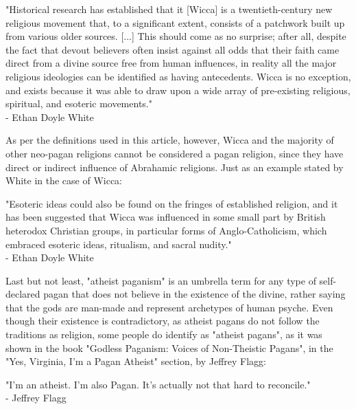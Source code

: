 \begin{center}
    \itshape
    \parbox{0.7\textwidth}{
    "Historical research has established that it [Wicca] is a twentieth-century new religious movement that,
    to a significant extent, consists of a patchwork built up from various older sources. [...] This should
    come as no surprise; after all, despite the fact that devout believers often insist against all odds that
    their faith came direct from a divine source free from human influences, in reality all the major
    religious ideologies can be identified as having antecedents. Wicca is no exception, and exists because
    it was able to draw upon a wide array of pre-existing religious, spiritual, and esoteric movements."\\
    \normalfont - Ethan Doyle White \cite{White2015}
    }
\end{center}

As per the definitions used in this article, however, Wicca and the majority of other neo-pagan religions
cannot be considered a pagan religion, since they have direct or indirect influence of Abrahamic religions.
Just as an example stated by White in the case of Wicca:

\begin{center}
    \itshape
    \parbox{0.7\textwidth}{
    "Esoteric ideas could also be found on the fringes of established religion, and it has been suggested that
    Wicca was influenced in some small part by British heterodox Christian groups, in particular forms of
    Anglo-Catholicism, which embraced esoteric ideas, ritualism, and sacral nudity."\\
    \normalfont - Ethan Doyle White \cite{White2015}
    }
\end{center}

Last but not least, "atheist paganism" is an umbrella term for any type of self-declared pagan that does not
believe in the existence of the divine, rather saying that the gods are man-made and represent archetypes of
human psyche. Even though their existence is contradictory, as atheist pagans do not follow the traditions as
religion, some people do identify as "atheist pagans", as it was shown in the book "Godless Paganism: Voices of
Non-Theistic Pagans", in the "Yes, Virginia, I'm a Pagan Atheist" section, by Jeffrey Flagg:

\begin{center}
    \itshape
    \parbox{0.7\textwidth}{
    "I'm an atheist. I'm also Pagan. It's actually not that hard to reconcile."\\
    \normalfont - Jeffrey Flagg \cite{Halstead2019}
    }
\end{center}

